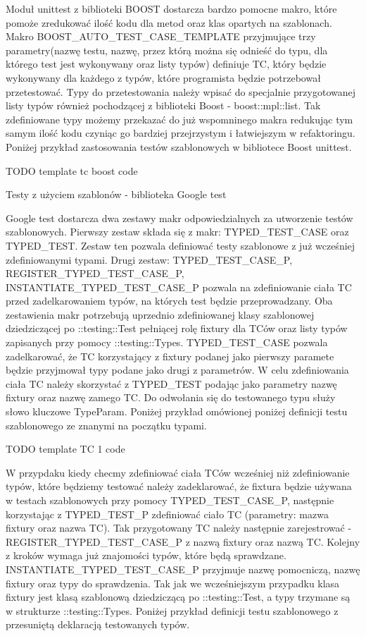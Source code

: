 Moduł unittest z biblioteki BOOST dostarcza bardzo pomocne makro, które pomoże zredukować ilość kodu dla metod oraz klas opartych na szablonach. Makro BOOST_AUTO_TEST_CASE_TEMPLATE przyjmujące trzy parametry(nazwę testu, nazwę, przez którą można się odnieść do typu, dla którego test jest wykonywany oraz listy typów) definiuje TC, który będzie wykonywany dla każdego z typów, które programista będzie potrzebował przetestować.
Typy do przetestowania należy wpisać do specjalnie przygotowanej listy typów również pochodzącej z biblioteki Boost - boost::mpl::list. Tak zdefiniowane typy możemy przekazać do już wspomninego makra redukując tym samym ilość kodu czyniąc go bardziej przejrzystym i łatwiejszym w refaktoringu.
Poniżej przykład zastosowania testów szablonowych w bibliotece Boost unittest.

TODO template tc boost code

Testy z użyciem szablonów - biblioteka Google test

Google test dostarcza dwa zestawy makr odpowiedzialnych za utworzenie testów szablonowych.
Pierwszy zestaw składa się z makr: TYPED_TEST_CASE oraz TYPED_TEST. Zestaw ten pozwala definiować testy szablonowe z już wcześniej zdefiniowanymi typami.
Drugi zestaw: TYPED_TEST_CASE_P, REGISTER_TYPED_TEST_CASE_P, INSTANTIATE_TYPED_TEST_CASE_P pozwala na zdefiniowanie ciała TC przed zadelkarowaniem typów, na których test będzie przeprowadzany.
Oba zestawienia makr potrzebują uprzednio zdefiniowanej klasy szablonowej dziedziczącej po ::testing::Test pełniącej rolę fixtury dla TCów oraz listy typów zapisanych przy pomocy ::testing::Types.
TYPED_TEST_CASE pozwala zadelkarować, że TC korzystający z fixtury podanej jako pierwszy paramete będzie przyjmował typy podane jako drugi z parametrów. W celu zdefiniowania ciała TC należy skorzystać z TYPED_TEST podając jako parametry nazwę fixtury oraz nazwę zamego TC.
Do odwołania się do testowanego typu służy słowo kluczowe TypeParam.
Poniżej przykład omówionej poniżej definicji testu szablonowego ze znanymi na początku typami.

TODO template TC 1 code

W przypdaku kiedy checmy zdefiniować ciała TCów wcześniej niż zdefiniowanie typów, które będziemy testować należy zadeklarować, że fixtura będzie używana w testach szablonowych przy pomocy TYPED_TEST_CASE_P, następnie korzystając z TYPED_TEST_P zdefiniować ciało TC (parametry: mazwa fixtury oraz nazwa TC). Tak przygotowany TC należy następnie zarejestrować - REGISTER_TYPED_TEST_CASE_P z nazwą fixtury oraz nazwą TC.
Kolejny z kroków wymaga już znajomości typów, które będą sprawdzane. INSTANTIATE_TYPED_TEST_CASE_P przyjmuje nazwę pomocniczą, nazwę fixtury oraz typy do sprawdzenia.
Tak jak we wcześniejszym przypadku klasa fixtury jest klasą szablonową dziedziczącą po ::testing::Test, a typy trzymane są w strukturze ::testing::Types.
Poniżej przykład definicji testu szablonowego z przesuniętą deklaracją testowanych typów.

